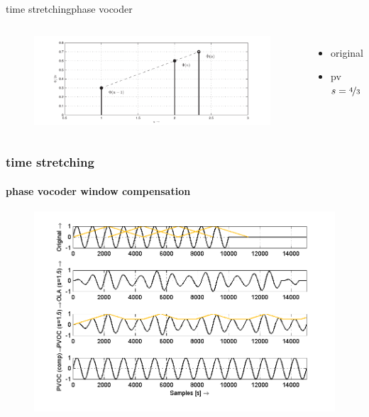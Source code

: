 \begin{frame}{time stretching}{phase vocoder}
\begin{columns}
            \column{4cm}\vspace{-20mm}
                    \vspace{20mm}
                {
                     \begin{figure}
                        \centering
                        \includegraphics[scale=.25]{graph/phaseextrapol.pdf}
                     \end{figure}
                }
                {
                    \begin{itemize}
                        \item   original 
                        \item   pv $s = \nicefrac{4}{3}$ 
                    \end{itemize}
                }
        \end{columns}
        \vspace{50mm}
    \end{frame}

    \begin{frame}\frametitle{time stretching}\framesubtitle{phase vocoder window compensation}
        \begin{figure}
            \centerline{\includegraphics[scale=.7]{graph/pvocIntro}}
        \end{figure}
    \end{frame}

